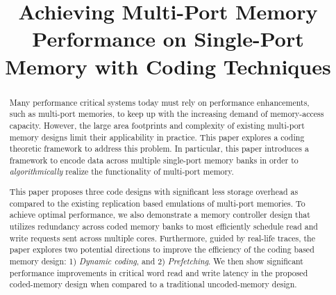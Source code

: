 \documentclass{sig-alternate}
\title{Achieving Multi-Port Memory Performance on Single-Port Memory with Coding Techniques}
\begin{document}
\maketitle
\thispagestyle{firstpage}
\pagestyle{plain}


\begin{abstract}
Many performance critical systems today must rely on performance enhancements, such as multi-port memories, to keep up with the increasing demand of memory-access capacity. However, the large area footprints and complexity of existing multi-port memory designs limit their applicability in practice. This paper explores a coding theoretic framework to address this problem. In particular, this paper introduces a framework to encode data across multiple single-port memory banks in order to {\em algorithmically} realize the functionality of multi-port memory.

This paper proposes three code designs with significant less storage overhead as compared to the existing replication based emulations of multi-port memories. To achieve optimal performance, we also demonstrate a memory controller design that utilizes redundancy across coded memory banks to most efficiently schedule read and write requests sent across multiple cores. Furthermore, guided by real-life traces, the paper explores two potential directions to improve the efficiency of the coding based memory design: 1) {\em Dynamic coding}, and 2) {\em Prefetching}. We then show significant performance improvements in critical word read and write latency in the proposed coded-memory design when compared to a traditional uncoded-memory design.
\begin{comment}
Many performance focussed systems need to rely on enhancements like multi-port memories to keep up with the increasing demand of access capacity, especially in a multi-core setup. However, the large area footprints and complexity of the existing designs of multi-port memories limits their applicability in practice. This paper explores a coding theoretic framework to address this problem in multi-port memory designs. 
In particular, this paper encodes the information across multiple single-port memory banks in order to {\em algorithmically} realize the functionality of a multi-port memory. 


\end{comment}
\end{abstract}
\end{document}
